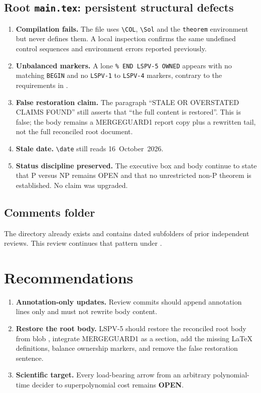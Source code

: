 \documentclass[11pt]{article}
\newcommand{\OPEN}{\textbf{OPEN}}
\begin{document}
\subsection{Root \texttt{main.tex}: persistent structural defects}
\begin{enumerate}
\item \textbf{Compilation fails.} The file uses \verb|\COL|, \verb|\Sol| and
the \texttt{theorem} environment but never defines them. A local inspection
confirms the same undefined control sequences and environment errors
reported previously.
\item \textbf{Unbalanced markers.} A lone \verb|% END LSPV-5 OWNED| appears
with no matching \texttt{BEGIN} and no \texttt{LSPV-1} to \texttt{LSPV-4}
markers, contrary to the requirements in .
\item \textbf{False restoration claim.} The paragraph ``STALE OR OVERSTATED
CLAIMS FOUND'' still asserts that ``the full content is restored''. This
is false; the body remains a MERGEGUARD1 report copy plus a rewritten
tail, not the full reconciled root document.
\item \textbf{Stale date.} \verb|\date| still reads 16~October~2026.
\item \textbf{Status discipline preserved.} The executive box and body
continue to state that P versus NP remains OPEN and that no unrestricted
non-P theorem is established. No claim was upgraded.
\end{enumerate}

\subsection{Comments folder}
The directory  already exists and contains dated
subfolders of prior independent reviews. This review continues that
pattern under .

\section{Recommendations}
\begin{enumerate}
\item \textbf{Annotation-only updates.} Review commits should append
annotation lines only and must not rewrite body content.
\item \textbf{Restore the root body.} LSPV-5 should restore the reconciled
root body from blob , integrate MERGEGUARD1 as a section,
add the missing LaTeX definitions, balance ownership markers, and remove
the false restoration sentence.
\item \textbf{Scientific target.} Every load-bearing arrow from an
arbitrary polynomial-time decider to superpolynomial cost remains
\OPEN{}.
\end{enumerate}
\end{document}
